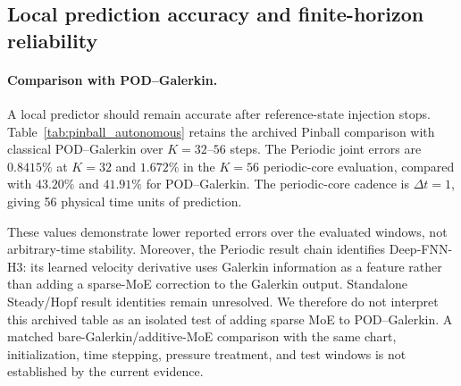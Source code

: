 \subsection{Local prediction accuracy and finite-horizon reliability}
\label{sec:exp_local}

\paragraph{Comparison with POD--Galerkin.}
A local predictor should remain accurate after reference-state
injection stops. Table~\ref{tab:pinball_autonomous} retains the
archived Pinball comparison with classical POD--Galerkin over
$K=32$--$56$ steps. The Periodic joint errors are $0.8415\%$
at $K=32$ and $1.672\%$ in the $K=56$ periodic-core evaluation,
compared with $43.20\%$ and $41.91\%$ for POD--Galerkin.
The periodic-core cadence is $\Delta t=1$, giving 56 physical
time units of prediction.

These values demonstrate lower reported errors over the evaluated
windows, not arbitrary-time stability. Moreover, the Periodic
result chain identifies Deep-FNN-H3: its learned velocity derivative
uses Galerkin information as a feature rather than adding a
sparse-MoE correction to the Galerkin output.
Standalone Steady/Hopf result identities remain unresolved.
We therefore do not interpret this archived table as an isolated
test of adding sparse MoE to POD--Galerkin.
A matched bare-Galerkin/additive-MoE comparison with the same chart,
initialization, time stepping, pressure treatment, and test windows
is not established by the current evidence.

